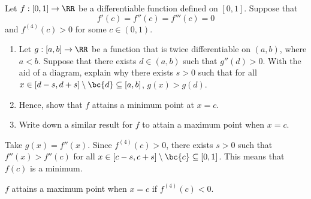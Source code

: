 \begin{problem}
    Let $f : [0, 1] \to \RR$ be a differentiable function defined on $[0, 1]$. Suppose that \[f'(c) = f''(c) = f'''(c) = 0\] and $f^{(4)}(c) > 0$ for some $c \in (0, 1)$.

    \begin{enumerate}
        \item Let $g: [a, b] \to \RR$ be a function that is twice differentiable on $(a, b)$, where $a < b$. Suppose that there exists $d \in (a, b)$ such that $g''(d) > 0$. With the aid of a diagram, explain why there exists $s > 0$ such that for all $x \in [d -s , d + s] \setminus \bc{d} \subseteq [a, b]$, $g(x) > g(d)$.
        \item Hence, show that $f$ attains a minimum point at $x = c$.
        \item Write down a similar result for $f$ to attain a maximum point when $x = c$.
    \end{enumerate}
\end{problem}
\begin{solution}
    \begin{ppart}
    \end{ppart}
    \begin{ppart}
        Take $g(x) = f''(x)$. Since $f^{(4)}(c) > 0$, there exists $s > 0$ such that $f''(x) > f''(c)$ for all $x \in [c-s, c+s] \setminus \bc{c} \subseteq [0, 1]$. This means that $f(c)$ is a minimum. 
    \end{ppart}
    \begin{ppart}
        $f$ attains a maximum point when $x = c$ if $f^{(4)}(c) < 0$.
    \end{ppart}
\end{solution}

%

